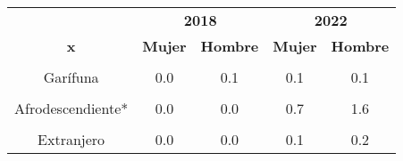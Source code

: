 \begin{tabular}[t]{ccccc}
\toprule
\multicolumn{1}{c}{\textbf{ }} & \multicolumn{2}{c}{\textbf{2018}} & \multicolumn{2}{c}{\textbf{2022}} \\
\cmidrule(l{3pt}r{3pt}){2-3} \cmidrule(l{3pt}r{3pt}){4-5}
\textbf{x} & \textbf{Mujer} & \textbf{Hombre} & \textbf{Mujer} & \textbf{Hombre}\\
\midrule
\cellcolor[HTML]{BDBDBD}{Maya} & \cellcolor[HTML]{BDBDBD}{10.7} & \cellcolor[HTML]{BDBDBD}{23.5} & \cellcolor[HTML]{BDBDBD}{11.6} & \cellcolor[HTML]{BDBDBD}{22.5}\\
Garífuna & 0.0 & 0.1 & 0.1 & 0.1\\
\cellcolor[HTML]{BDBDBD}{Xinka} & \cellcolor[HTML]{BDBDBD}{0.4} & \cellcolor[HTML]{BDBDBD}{1.4} & \cellcolor[HTML]{BDBDBD}{0.4} & \cellcolor[HTML]{BDBDBD}{0.8}\\
Afrodescendiente* & 0.0 & 0.0 & 0.7 & 1.6\\
\cellcolor[HTML]{BDBDBD}{Ladino} & \cellcolor[HTML]{BDBDBD}{22.8} & \cellcolor[HTML]{BDBDBD}{41.1} & \cellcolor[HTML]{BDBDBD}{24.8} & \cellcolor[HTML]{BDBDBD}{37.2}\\
Extranjero & 0.0 & 0.0 & 0.1 & 0.2\\
\bottomrule
\end{tabular}
